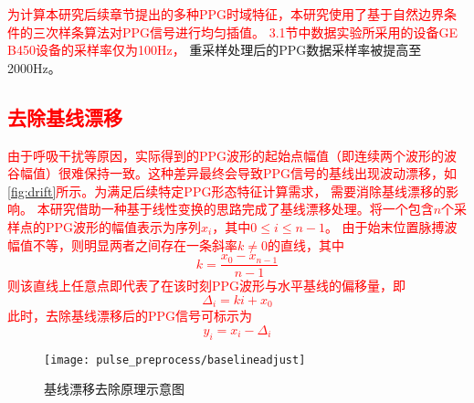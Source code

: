 
\textcolor{red}{
为计算本研究后续章节提出的多种PPG时域特征，本研究使用了基于自然边界条件的三次样条算法对PPG信号进行均匀插值。
3.1节中数据实验所采用的设备GE B450设备的采样率仅为100Hz，}
重采样处理后的PPG数据采样率被提高至2000Hz。

\subsection{\textcolor{red}{去除基线漂移}}
\textcolor{red}{
由于呼吸干扰等原因，实际得到的PPG波形的起始点幅值（即连续两个波形的波谷幅值）很难保持一致。这种差异最终会导致PPG信号的基线出现波动漂移，如\autoref{fig:drift}所示。为满足后续特定PPG形态特征计算需求，
需要消除基线漂移的影响。}
\textcolor{red}{
本研究借助一种基于线性变换的思路完成了基线漂移处理。将一个包含$n$个采样点的PPG波形的幅值表示为序列$x_i$，其中$0 \le i \le n-1$。
由于始末位置脉搏波幅值不等，则明显两者之间存在一条斜率$k \ne 0$的直线，其中
\begin{equation}
    \label{equ:linek}
    k=\frac{x_0-x_{n-1}}{n-1}
\end{equation}
则该直线上任意点即代表了在该时刻PPG波形与水平基线的偏移量，即
\begin{equation}
    \label{equ:liney}
    \Delta_i=ki+x_0
\end{equation}
此时，去除基线漂移后的PPG信号可标示为
\begin{equation}
    \label{equ:adjusta}
    y_i=x_i-\Delta_i
\end{equation}
}
\begin{figure}[htbp]
    \centering
    \texttt{[image: pulse\_preprocess/baselineadjust]}
    \caption{\label{fig:drift}基线漂移去除原理示意图}
\end{figure}

